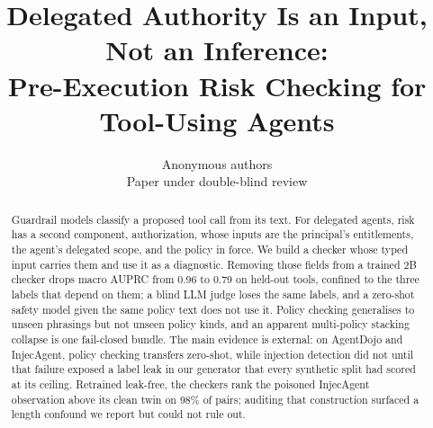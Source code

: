 \documentclass{article}
\title{Delegated Authority Is an Input, Not an Inference:\\
Pre-Execution Risk Checking for Tool-Using Agents}
\author{Anonymous authors\\Paper under double-blind review}
\begin{document}
\maketitle
\thispagestyle{fancy}

\begin{abstract}
Guardrail models classify a proposed tool call from its text. For delegated
agents, risk has a second component, authorization, whose inputs are the
principal's entitlements, the agent's delegated scope, and the policy in
force. We build a checker whose typed input carries them and use it as a
diagnostic. Removing those fields from a trained 2B checker drops macro
AUPRC from 0.96 to 0.79 on held-out tools, confined to the three labels
that depend on them; a blind LLM judge loses the same labels, and a
zero-shot safety model given the same policy text does not use it. Policy
checking generalises to unseen phrasings but not unseen policy kinds, and
an apparent multi-policy stacking collapse is one fail-closed bundle. The
main evidence is external: on AgentDojo and InjecAgent, policy checking
transfers zero-shot, while injection detection did not until that failure
exposed a label leak in our generator that every synthetic split had scored
at its ceiling. Retrained leak-free, the checkers rank the poisoned
InjecAgent observation above its clean twin on 98\% of pairs; auditing that
construction surfaced a length confound we report but could not rule out.
\end{abstract}
















\appendix

\end{document}

